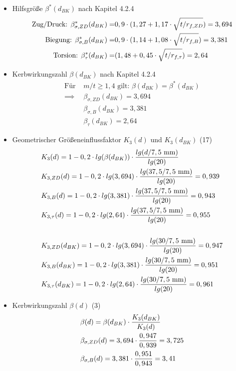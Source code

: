\begin{itemize}
\item Hilfsgröße $ \beta^* (d_{BK})$ nach Kapitel 4.2.4
	\begin{align*}
	\text{Zug/Druck: }\beta _{\sigma,ZD} ^* (d_{BK}) =& 0,9 \cdot (1,27 + 1,17 \cdot \sqrt{t/r_{f,ZD}})  = 3,694 \\ 
	\text{Biegung: }\beta _{\sigma,B} ^* (d_{BK}) =& 0,9 \cdot (1,14 + 1,08 \cdot \sqrt{t/r_{f,B}})  = 3,381 \\ 
	\text{Torsion: }\beta _{\tau} ^* (d_{BK}) =& (1,48 + 0,45 \cdot \sqrt{t/r_{f,\tau}})  = 2,64
	\end{align*}
\item Kerbwirkungszahl $\beta (d_{BK}) $ nach Kapitel 4.2.4
	\begin{align*}
	\text{Für } &m/t \ge 1,4 \text{ gilt: } \beta (d_{BK}) = \beta^* (d_{BK}) \\
	\implies &\beta_{\sigma,ZD} (d_{BK}) = 3,694 \\
	&\beta_{\sigma,B}(d_{BK}) = 3,381 \\
	&\beta_{ \tau} (d_{BK})= 2,64 
	\end{align*}
\item Geometrischer Größeneinflussfaktor $K_3 (d) $ und $K_3 (d_{BK}) $ \hfill (17)
	\begin{align*}
	& K_3 (d) = 1-0,2 \cdot lg(\beta (d_{BK})) \cdot \frac{lg(d/7,5 \text{ mm})}{lg(20)}\\
	&K_{3,ZD} (d) = 1-0,2 \cdot lg(3,694) \cdot \frac{lg(37,5/7,5 \text{ mm})}{lg(20)} =0,939\\
	&K_{3,B} (d) = 1-0,2 \cdot lg(3,381) \cdot \frac{lg(37,5/7,5 \text{ mm})}{lg(20)} =0,943\\
	&K_{3,\tau} (d) = 1-0,2 \cdot lg(2,64) \cdot \frac{lg(37,5/7,5 \text{ mm})}{lg(20)} =0,955\\ \\
	&K_{3,ZD} (d_{BK}) = 1-0,2 \cdot lg(3,694) \cdot \frac{lg(30/7,5 \text{ mm})}{lg(20)} =0,947\\
	&K_{3,B} (d_{BK}) = 1-0,2 \cdot lg(3,381) \cdot \frac{lg(30/7,5 \text{ mm})}{lg(20)} =0,951\\
	&K_{3,\tau} (d_{BK}) = 1-0,2 \cdot lg(2,64) \cdot \frac{lg(30/7,5 \text{ mm})}{lg(20)} =0,961
	\end{align*}
\item Kerbwirkungszahl $\beta (d) $ \hfill (3)
	\begin{align*}
	 &\beta (d) = \beta (d_{BK}) \x \frac{K_3 (d_{BK})}{K_3 (d)} \\
	 &\beta_{\sigma,ZD} (d) =  3,694 \x \frac{0,947}{0,939} = 3,725\\
	&\beta_{\sigma,B}(d) = 3,381 \x \frac{0,951}{0,943} =3,41\\

\end{align*}
\end{itemize}
